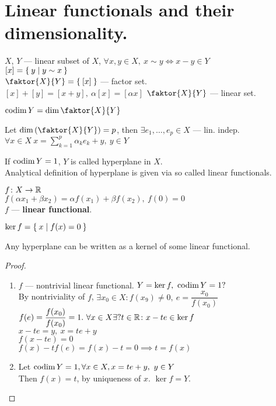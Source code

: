 \section{Linear functionals and their dimensionality.}
\begin{defn}
  $X$, $Y$ --- linear subset of $X$, $\forall x, y \in X,\ x \sim y \iff x - y
  \in Y$ \\
  $[x] = \Set{y | y \sim x}$ \\
  $\faktor{X}{Y} = \Set{[x]}$ --- factor set. \\
  $[x] + [y] = [x + y],\ \alpha [x] = [\alpha x]$ 
  $\faktor{X}{Y}$ --- linear set.
\end{defn}
\begin{defn}
  $\codim{Y} = \dim{\faktor{X}{Y}}$
\end{defn}

\begin{stm}
  Let $\dim\left(\faktor{X}{Y}\right) = p$, then $\exists e_1, \dotsc, e_p \in X$ --- lin. indep. \\
  $\forall x \in X\ x = \sum\limits_{k = 1}^p \alpha_k e_k + y,\ y \in Y$
\end{stm}

\noindent If $\operatorname{codim}{Y} = 1$, $Y$ is called hyperplane in $X$.\\
Analytical definition of hyperplane is given via so called linear functionals.

\begin{defn}
  $f \colon X \to \mathbb{R}$  \\
  $f(\alpha x_1 + \beta x_2) = \alpha f(x_1) + \beta f(x_2),\ f(0) = 0$ \\
  $f$ --- \textbf{linear functional}.
\end{defn}

\begin{defn}
  $\ker{f} = \Set{x | f(x) = 0}$
\end{defn}

\begin{stm}
  Any hyperplane can be written as a kernel of some linear functional.
\end{stm}

\begin{proof}
  \begin{enumerate}
  \item $f$ --- nontrivial linear functional. $Y = \ker{f},\ \codim{Y} = 1?$ \\
    By nontriviality of $f$, $\exists x_0 \in X \colon f(x_9) \neq 0,\ e =
    \dfrac{x_0}{f(x_0)}$ \\
    $f(e) = \dfrac{f(x_0)}{f(x_0)} = 1.\ \forall x \in X \exists ? t \in \mathbb{R}
    \colon x - t e \in \ker{f}$ \\
    $x - te = y,\ x = te + y$ \\
    $f(x - te) = 0$  \\
    $f(x) - tf(e) = f(x) - t = 0 \implies t = f(x)$ 
  \item Let $\operatorname{codim}{Y} = 1, \forall x \in X, x = te + y,\ y \in Y$ \\
    Then $f(x) = t$, by uniqueness of $x$. $\ker{f} = Y$.
  \end{enumerate}
\end{proof}